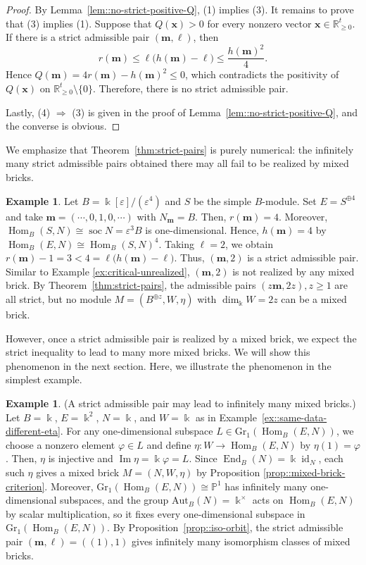 \documentclass[a4,12pt]{amsart}
\numberwithin{equation}{section} %
\def\Hom{\operatorname{Hom}} %
\def\End{\operatorname{End}} %
\def\soc{\operatorname{soc}} %
\def\Im{\operatorname{Im}} %
\def\Gr{\mathrm{Gr}} %
\def\Aut{\mathrm{Aut}} %
\theoremstyle{definition} %
\newtheorem{example}[theorem]{Example} %
\begin{document}
\begin{proof}
By Lemma~\ref{lem::no-strict-positive-Q}, (1) implies (3). It remains to prove that (3) implies (1). Suppose that $Q(\mathbf{x})>0$ for every nonzero vector $\mathbf{x}\in\mathbb{R}_{\geq 0}^t$. If there is a strict admissible pair $(\mathbf{m},\ell)$, then
\[
r(\mathbf{m})
\leq
\ell\bigl(h(\mathbf{m})-\ell\bigr)
\leq
\frac{h(\mathbf{m})^2}{4}.
\]
Hence $Q(\mathbf{m}) = 4r(\mathbf{m})-h(\mathbf{m})^2 \leq 0$, which contradicts the positivity of $Q(\mathbf{x})$ on $\mathbb{R}_{\geq 0}^t\setminus\{0\}$.
Therefore, there is no strict admissible pair.

Lastly, (4) $\Rightarrow$ (3) is given in the proof of Lemma~\ref{lem::no-strict-positive-Q}, and the converse is obvious.
\end{proof}

We emphasize that Theorem~\ref{thm:strict-pairs} is purely numerical: the infinitely many strict admissible pairs obtained there may all fail to be realized by mixed bricks. 

\begin{example}
Let $B=\Bbbk[\varepsilon]/(\varepsilon^4)$ and $S$ be the simple $B$-module. Set $E=S^{\oplus 4}$ and take $\mathbf{m}=(\cdots, 0, 1,0,\cdots)$ with $N_{\mathbf{m}}=B$. Then, $r(\mathbf{m})=4$. Moreover, $\Hom_B(S,N)\cong\soc N=\varepsilon^3B$ is one-dimensional. Hence, $h(\mathbf{m})=4$ by $\Hom_B(E,N)\cong\Hom_B(S,N)^4$. Taking $\ell=2$, we obtain $r(\mathbf{m})-1=3<4=\ell\bigl(h(\mathbf{m})-\ell\bigr)$. Thus, $(\mathbf{m},2)$ is a strict admissible pair. Similar to Example \ref{ex:critical-unrealized}, $(\mathbf{m},2)$ is not realized by any mixed brick. By Theorem~\ref{thm:strict-pairs}, the admissible pairs $(z\mathbf{m},2z), z\geq1$ are all strict, but no module $M=(B^{\oplus z},W,\eta)$ with $\dim_{\Bbbk}W=2z$ can be a mixed brick. 
\end{example}

However, once a strict admissible pair is realized by a mixed brick, we expect the strict inequality to lead to many more mixed bricks. We will show this phenomenon in the next section. Here, we illustrate the phenomenon in the simplest example. 

\begin{example}
(A strict admissible pair may lead to infinitely many mixed bricks.) Let $B=\Bbbk$, $E=\Bbbk^2$, $N=\Bbbk$, and $W=\Bbbk$ as in Example~\ref{ex::same-data-different-eta}. For any one-dimensional subspace $L\in\Gr_1(\Hom_B(E,N))$, we choose a nonzero element $\varphi\in L$ and define $\eta\colon W\to\Hom_B(E,N)$ by $\eta(1)=\varphi$. Then, $\eta$ is injective and $\Im\eta=\Bbbk\varphi=L$. Since $\End_B(N)=\Bbbk\operatorname{id}_{N}$, each such $\eta$ gives a mixed brick $M=(N,W,\eta)$ by Proposition \ref{prop::mixed-brick-criterion}.
Moreover, $\Gr_1(\Hom_B(E,N))\cong\mathbb{P}^1$ has infinitely many one-dimensional subspaces, and the group $\Aut_B(N)=\Bbbk^{\times}$ acts on $\Hom_B(E,N)$ by scalar multiplication, so it fixes every one-dimensional subspace in $\Gr_1(\Hom_B(E,N))$. By Proposition~\ref{prop::iso-orbit}, the strict admissible pair $(\mathbf{m},\ell)=((1),1)$ gives infinitely many isomorphism classes of mixed bricks.
\end{example}
\end{document}
